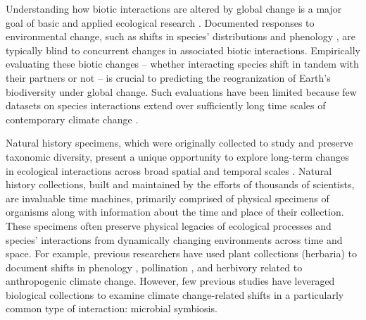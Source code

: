 \documentclass[11pt]{article}
\let\cite\citep
\begin{document}
	
Understanding how biotic interactions are altered by global change is a major goal of basic and applied ecological research \cite{gilman2010framework,blois2013climate}.
Documented responses to environmental change, such as shifts in species' distributions \cite{aitken2008adaptation} and phenology \cite{piao2019plant}, are typically blind to concurrent changes in associated biotic interactions.
Empirically evaluating these biotic changes -- whether interacting species shift in tandem with their partners or not \cite{hillerislambers2013will} -- is crucial to predicting the reogranization of Earth's biodiversity under global change. 
Such evaluations have been limited because few datasets on species interactions extend over sufficiently long time scales of contemporary climate change \cite{poisot2021global}.

Natural history specimens, which were originally collected to study and preserve taxonomic diversity, present a unique opportunity to explore long-term changes in ecological interactions across broad spatial and temporal scales \citep{meineke2018unrealized}. 
Natural history collections, built and maintained by the efforts of thousands of scientists, are invaluable time machines, primarily comprised of physical specimens of organisms along with information about the time and place of their collection. 
These specimens often preserve physical legacies of ecological processes and species' interactions from dynamically changing environments across time and space.
For example, previous researchers have used plant collections (herbaria) to document shifts in phenology \citep{willis2017old, park2019herbarium,  berg2019examination}, pollination \citep{pauw2011reconstruction, duan2019century}, and herbivory \citep{meineke2019herbarium} related to anthropogenic climate change. 
However, few previous studies have leveraged biological collections to examine climate change-related shifts in a particularly common type of interaction: microbial symbiosis.
\end{document}

